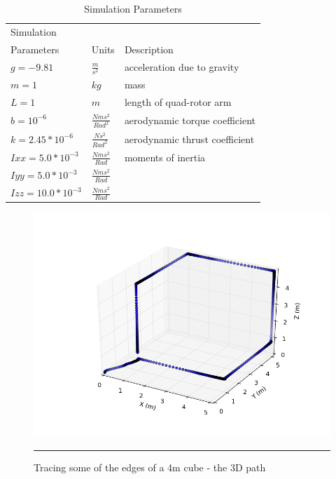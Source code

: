 \begin{table}
\label{table:params}
\begin{doublespace}
\centering
\begin{tabular}{l l l}
    Simulation\\ Parameters & Units & Description\\
    \hline
    $g = -9.81            $& $ \frac{m}{s^2}          $ & acceleration due to gravity\\
    $m = 1                $& $ kg                      $ & mass\\
    $L = 1                $& $ m                       $ & length of quad-rotor arm\\
    $b = 10^{-6}          $& $ \frac{N m s^2}{Rad^2}  $ & aerodynamic torque coefficient\\
    $k = 2.45*10^{-6}     $& $ \frac{N s^2}{Rad^2}    $ & aerodynamic thrust coefficient\\
    $Ixx = 5.0*10^{-3}    $& $ \frac{N m s^2}{Rad}    $ & moments of inertia \\
    $Iyy = 5.0*10^{-3}    $& $ \frac{N m s^2}{Rad}    $ & \\
    $Izz = 10.0*10^{-3}   $& $ \frac{N m s^2}{Rad}    $ & \\
    \hline
\end{tabular}
\caption[Simulation Parameters]{Simulation Parameters}
\end{doublespace}
\end{table}

\begin{figure}[htbp]
	\centering
		\includegraphics[width=\textwidth]{Figures/CubeEdges3D.png}
		\rule{35em}{0.5pt}
	\caption[Cube Edges 3D]{Tracing some of the edges of a 4m cube - the 3D path}
	\label{fig:Cube Edges 3D}
\end{figure}

